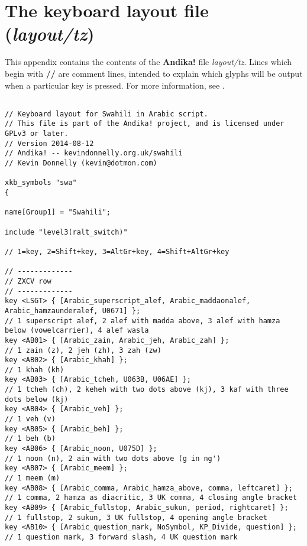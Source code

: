 \chapter{The keyboard layout file (\textit{layout/tz})}
\renewcommand{\thesection}{E/\arabic{section}}  %
\setcounter{section}{0}  %
\label{appE}

This appendix contains the contents of the \textbf{Andika!} file \textit{layout/tz}.  Lines which begin with \textbf{//} are comment lines, intended to explain which glyphs will be output when a particular key is pressed.  For more information, see .

\begin{verbatim}

// Keyboard layout for Swahili in Arabic script.
// This file is part of the Andika! project, and is licensed under GPLv3 or later.
// Version 2014-08-12
// Andika! -- kevindonnelly.org.uk/swahili
// Kevin Donnelly (kevin@dotmon.com)

xkb_symbols "swa"
{

name[Group1] = "Swahili";

include "level3(ralt_switch)"

// 1=key, 2=Shift+key, 3=AltGr+key, 4=Shift+AltGr+key

// -------------
// ZXCV row
// -------------
key <LSGT> { [Arabic_superscript_alef, Arabic_maddaonalef, Arabic_hamzaunderalef, U0671] };
// 1 superscript alef, 2 alef with madda above, 3 alef with hamza below (vowelcarrier), 4 alef wasla
key <AB01> { [Arabic_zain, Arabic_jeh, Arabic_zah] };
// 1 zain (z), 2 jeh (zh), 3 zah (zw)
key <AB02> { [Arabic_khah] };
// 1 khah (kh)
key <AB03> { [Arabic_tcheh, U063B, U06AE] };
// 1 tcheh (ch), 2 keheh with two dots above (kj), 3 kaf with three dots below (kj)
key <AB04> { [Arabic_veh] };
// 1 veh (v)
key <AB05> { [Arabic_beh] };
// 1 beh (b)
key <AB06> { [Arabic_noon, U075D] };
// 1 noon (n), 2 ain with two dots above (g in ng')
key <AB07> { [Arabic_meem] };
// 1 meem (m)
key <AB08> { [Arabic_comma, Arabic_hamza_above, comma, leftcaret] };
// 1 comma, 2 hamza as diacritic, 3 UK comma, 4 closing angle bracket
key <AB09> { [Arabic_fullstop, Arabic_sukun, period, rightcaret] };
// 1 fullstop, 2 sukun, 3 UK fullstop, 4 opening angle bracket
key <AB10> { [Arabic_question_mark, NoSymbol, KP_Divide, question] };
// 1 question mark, 3 forward slash, 4 UK question mark


\end{verbatim}
